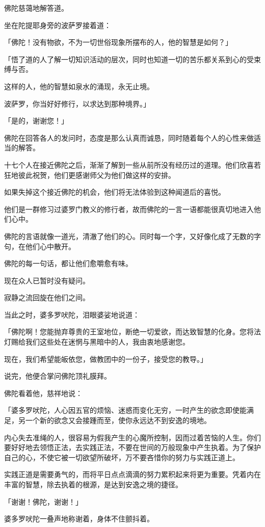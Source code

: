 \documentclass[twoside,openany]{book}
\begin{document}
佛陀慈蔼地解答道。

坐在陀提耶身旁的波萨罗接着道：

「佛陀！没有物欲，不为一切世俗现象所摆布的人，他的智慧是如何？」

「悟了道的人了解一切知识活动的层次，同时也知道一切的苦乐都关系到心的受束缚与否。

这样的人，他的智慧如泉水的涌现，永无止境。

波萨罗，你当好好修行，以求达到那种境界。」

「是的，谢谢您！」

佛陀在回答各人的发问时，态度是那么认真而诚恳，同时随着每个人的心性来做适当的解答。

十七个人在接近佛陀之后，渐渐了解到一些从前所没有经历过的道理。他们欣喜若狂地彼此祝贺，他们更感谢师父为他们做这样的安排。

如果失掉这个接近佛陀的机会，他们将无法体验到这种闻道后的喜悦。

他们是一群修习过婆罗门教义的修行者，故而佛陀的一言一语都能很真切地进入他们心中。

佛陀的言语就像一道光，清澈了他们的心。同时每一个字，又好像化成了无数的字句，在他们心中散开。

佛陀的每一句话，都让他们愈嚼愈有味。

现在众人已暂时没有疑问。

寂静之流回旋在他们之间。

当此之时，婆多罗吠陀，泪眼婆娑地说道：

「佛陀啊！您能抛弃尊贵的王室地位，断绝一切爱欲，而达致智慧的化身。您将法灯赐给我们这些处在迷惘与黑暗中的人，我由衷地感谢您。

现在，我们希望能皈依您，做教团中的一份子，接受您的教导。」

说完，他便合掌问佛陀顶礼膜拜。

佛陀看着他，慈祥地说：

「婆多罗吠陀，人心因五官的烦恼、迷惑而变化无穷，一时产生的欲念即使能满足，另一个新的欲念又会接踵而至，使你永远达不到安逸的境地。

内心失去准绳的人，很容易为假我产生的心魔所控制，因而过着苦恼的人生。你们要好好地去领悟正法，去实践正法，不要在世间的万般现象中产生执着。为了保护自己的心，不使它被一切欲望所破坏，万不要吝惜你的努力与实践正道上。

实践正道是需要勇气的，而将平日点点滴滴的努力累积起来将更为重要。凭着内在丰富的智慧，除去执着的根源，是达到安逸之境的捷径。

「谢谢！佛陀，谢谢！」

婆多罗吠陀一叠声地称谢着，身体不住颤抖着。
\end{document}
